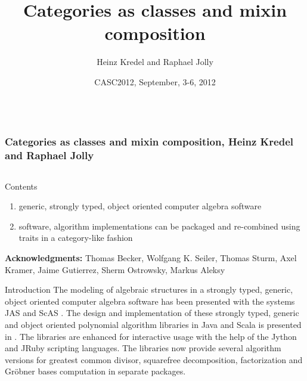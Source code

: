 \documentclass[final]{beamer}
\title[Categories and Mixins]{Categories as classes and mixin composition}
\author[Kredel \& Jolly]{Heinz Kredel\inst{1} and Raphael Jolly\inst{2}}
\institute{IT-Center, University of Mannheim, Germany %
\and Databeans, Paris, France%
}
\date{CASC2012, September, 3-6, 2012}
\begin{document}

\begin{frame}[fragile] 
\frametitle{\mbox{ }\\ \hspace{13cm}Categories as classes and mixin composition, Heinz Kredel and Raphael Jolly}
\begin{columns}[t]

\begin{column}{.3\linewidth}

  \begin{block}{\large Contents}
  \normalsize 
  \begin{enumerate}
  \item generic, strongly typed, object oriented computer algebra software
  \item software, algorithm implementations can be packaged and
    re-combined using traits in a category-like fashion
  \end{enumerate}
\tiny
{\scriptsize \textbf{Acknowledgments:}}
Thomas Becker, Wolfgang K. Seiler, Thomas Sturm, Axel Kramer, 
Jaime Gutierrez, Sherm Ostrowsky, Markus Aleksy
  \end{block}
  \hfill
  \begin{block}{\large Introduction}
\scriptsize
The modeling of algebraic structures in a strongly typed, generic,
object oriented computer algebra software has been presented with the
systems JAS \cite{Kredel:2000,Kredel:2008} and ScAS \cite{Jolly:2010}.
The design and implementation of these strongly typed, generic and
object oriented polynomial algorithm libraries in Java and Scala is
presented in \cite{JollyKredel:2010}. %
The libraries are enhanced for interactive usage with the help of the Jython and
JRuby scripting languages. The libraries now
provide several algorithm versions for greatest common divisor,
squarefree decomposition, factorization and Gr\"obner bases
computation in separate packages.


\end{block}
\end{column}
\end{columns}
\end{frame}
\end{document}

